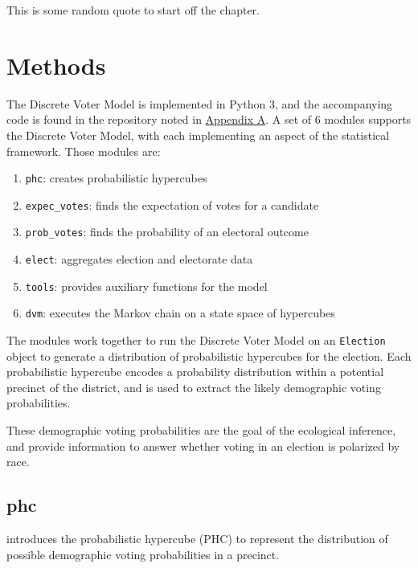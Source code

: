 \begin{savequote}[75mm]
This is some random quote to start off the chapter.
\end{savequote}

\chapter{Methods}

The Discrete Voter Model is implemented in Python 3, and the accompanying code is found in the repository noted in \hyperref[chap:appendix]{Appendix A}. A set of $6$ modules supports the Discrete Voter Model, with each implementing an aspect of the statistical framework. Those modules are:

\begin{enumerate}
  \item \texttt{phc}: creates probabilistic hypercubes
  \item \texttt{expec\_votes}: finds the expectation of votes for a candidate
  \item \texttt{prob\_votes}: finds the probability of an electoral outcome
  \item \texttt{elect}: aggregates election and electorate data
  \item \texttt{tools}: provides auxiliary functions for the model
  \item \texttt{dvm}: executes the Markov chain on a state space of hypercubes
\end{enumerate}

The modules work together to run the Discrete Voter Model on an \texttt{Election} object to generate a distribution of probabilistic hypercubes for the election. Each probabilistic hypercube encodes a probability distribution within a potential precinct of the district, and is used to extract the likely demographic voting probabilities.

These demographic voting probabilities are the goal of the ecological inference, and provide information to answer whether voting in an election is polarized by race.

\section{phc}

 introduces the probabilistic hypercube (PHC) to represent the distribution of possible demographic voting probabilities in a precinct.

